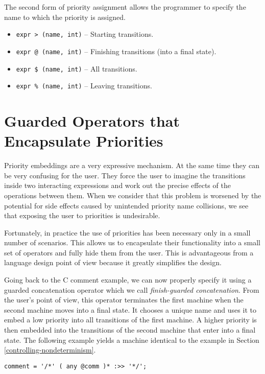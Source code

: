 \documentclass[letterpaper,11pt,oneside]{book}
\newcommand{\verbspace}{\vspace{10pt}}
\newenvironment{inline_code}{\def\baselinestretch{1}\vspace{12pt}\small}{}
\begin{document}
The second form of priority assignment allows the programmer to specify the name
to which the priority is assigned.

\begin{itemize}
\item \verb|expr > (name, int)| -- Starting transitions.
\item \verb|expr @ (name, int)| -- Finishing transitions (into a final state).
\item \verb|expr $ (name, int)| -- All transitions.
\item \verb|expr % (name, int)| -- Leaving transitions.
\end{itemize}

\section{Guarded Operators that Encapsulate Priorities}

Priority embeddings are a very expressive mechanism. At the same time they
can be very confusing for the user. They force the user to imagine
the transitions inside two interacting expressions and work out the precise
effects of the operations between them. When we consider
that this problem is worsened by the
potential for side effects caused by unintended priority name collisions, we
see that exposing the user to priorities is undesirable.

Fortunately, in practice the use of priorities has been necessary only in a
small number of scenarios.  This allows us to encapsulate their functionality
into a small set of operators and fully hide them from the user. This is
advantageous from a language design point of view because it greatly simplifies
the design.  

Going back to the C comment example, we can now properly specify
it using a guarded concatenation operator which we call {\em finish-guarded
concatenation}. From the user's point of view, this operator terminates the
first machine when the second machine moves into a final state.  It chooses a
unique name and uses it to embed a low priority into all
transitions of the first machine. A higher priority is then embedded into the
transitions of the second machine that enter into a final state. The following
example yields a machine identical to the example in Section 
\ref{controlling-nondeterminism}.

\begin{inline_code}
\begin{verbatim}
comment = '/*' ( any @comm )* :>> '*/';
\end{verbatim}
\end{inline_code}
\verbspace
\end{document}

